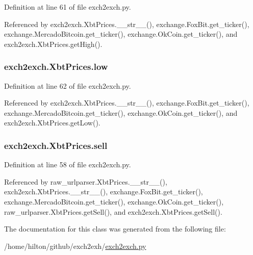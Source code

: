 Definition at line 61 of file exch2exch.\-py.



Referenced by exch2exch.\-Xbt\-Prices.\-\_\-\-\_\-str\-\_\-\-\_\-(), exchange.\-Fox\-Bit.\-get\-\_\-ticker(), exchange.\-Mercado\-Bitcoin.\-get\-\_\-ticker(), exchange.\-Ok\-Coin.\-get\-\_\-ticker(), and exch2exch.\-Xbt\-Prices.\-get\-High().

\hypertarget{classexch2exch_1_1_xbt_prices_a8cef13f833a894d4fc5b8296bb4906fa}{
\subsubsection[{low}]{\setlength{\rightskip}{0pt plus 5cm}exch2exch.\-Xbt\-Prices.\-low}}\label{classexch2exch_1_1_xbt_prices_a8cef13f833a894d4fc5b8296bb4906fa}


Definition at line 62 of file exch2exch.\-py.



Referenced by exch2exch.\-Xbt\-Prices.\-\_\-\-\_\-str\-\_\-\-\_\-(), exchange.\-Fox\-Bit.\-get\-\_\-ticker(), exchange.\-Mercado\-Bitcoin.\-get\-\_\-ticker(), exchange.\-Ok\-Coin.\-get\-\_\-ticker(), and exch2exch.\-Xbt\-Prices.\-get\-Low().

\hypertarget{classexch2exch_1_1_xbt_prices_a06fd0cfb03d485af3364a0d86fbe5385}{
\subsubsection[{sell}]{\setlength{\rightskip}{0pt plus 5cm}exch2exch.\-Xbt\-Prices.\-sell}}\label{classexch2exch_1_1_xbt_prices_a06fd0cfb03d485af3364a0d86fbe5385}


Definition at line 58 of file exch2exch.\-py.



Referenced by raw\-\_\-urlparser.\-Xbt\-Prices.\-\_\-\-\_\-str\-\_\-\-\_\-(), exch2exch.\-Xbt\-Prices.\-\_\-\-\_\-str\-\_\-\-\_\-(), exchange.\-Fox\-Bit.\-get\-\_\-ticker(), exchange.\-Mercado\-Bitcoin.\-get\-\_\-ticker(), exchange.\-Ok\-Coin.\-get\-\_\-ticker(), raw\-\_\-urlparser.\-Xbt\-Prices.\-get\-Sell(), and exch2exch.\-Xbt\-Prices.\-get\-Sell().



The documentation for this class was generated from the following file\-:\begin{DoxyCompactItemize}
\item 
/home/hilton/github/exch2exh/\hyperlink{exch2exch_8py}{exch2exch.\-py}\end{DoxyCompactItemize}

